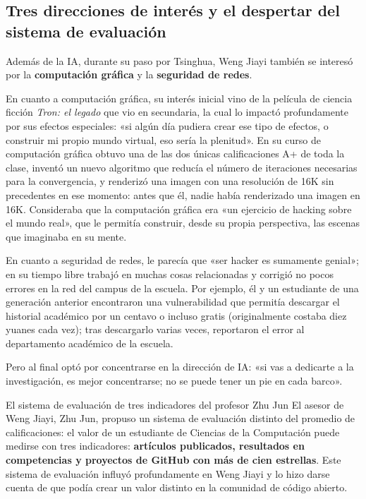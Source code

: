 \subsection{Tres direcciones de interés y el despertar del sistema de evaluación}

Además de la IA, durante su paso por Tsinghua, Weng Jiayi también se interesó por la \textbf{computación gráfica} y la \textbf{seguridad de redes}.

En cuanto a computación gráfica, su interés inicial vino de la película de ciencia ficción \textit{Tron: el legado} que vio en secundaria, la cual lo impactó profundamente por sus efectos especiales: «si algún día pudiera crear ese tipo de efectos, o construir mi propio mundo virtual, eso sería la plenitud». En su curso de computación gráfica obtuvo una de las dos únicas calificaciones A+ de toda la clase, inventó un nuevo algoritmo que reducía el número de iteraciones necesarias para la convergencia, y renderizó una imagen con una resolución de 16K sin precedentes en ese momento: antes que él, nadie había renderizado una imagen en 16K. Consideraba que la computación gráfica era «un ejercicio de hacking sobre el mundo real», que le permitía construir, desde su propia perspectiva, las escenas que imaginaba en su mente.

En cuanto a seguridad de redes, le parecía que «ser hacker es sumamente genial»; en su tiempo libre trabajó en muchas cosas relacionadas y corrigió no pocos errores en la red del campus de la escuela. Por ejemplo, él y un estudiante de una generación anterior encontraron una vulnerabilidad que permitía descargar el historial académico por un centavo o incluso gratis (originalmente costaba diez yuanes cada vez); tras descargarlo varias veces, reportaron el error al departamento académico de la escuela.

Pero al final optó por concentrarse en la dirección de IA: «si vas a dedicarte a la investigación, es mejor concentrarse; no se puede tener un pie en cada barco».

\begin{knowledgebox}{El sistema de evaluación de tres indicadores del profesor Zhu Jun}
El asesor de Weng Jiayi, Zhu Jun, propuso un sistema de evaluación distinto del promedio de calificaciones: el valor de un estudiante de Ciencias de la Computación puede medirse con tres indicadores: \textbf{artículos publicados, resultados en competencias y proyectos de GitHub con más de cien estrellas}. Este sistema de evaluación influyó profundamente en Weng Jiayi y lo hizo darse cuenta de que podía crear un valor distinto en la comunidad de código abierto.
\end{knowledgebox}

